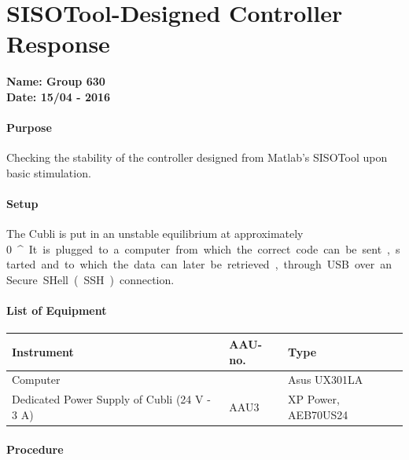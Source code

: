 \chapter{SISOTool-Designed Controller Response} \label{app:sisoToolDControllerTest}
\textbf{Name: Group 630}\\
\textbf{Date: 15/04 - 2016}

\subsubsection{Purpose}
Checking the stability of the controller designed from Matlab's SISOTool upon basic stimulation.

\subsubsection{Setup}
The Cubli is put in an unstable equilibrium at approximately \SI{0}{^{\circ}}. 
It is plugged to a computer from which the correct code can be sent, started and to which the data can later be retrieved, through USB over an Secure SHell (SSH) connection.

\subsubsection{List of Equipment}
\begin{table}[H]
\begin{tabular}{|p{8cm}|p{2cm}|p{4cm}|}
\hline%
  \textbf{Instrument}    &  \textbf{AAU-no.}          &  \textbf{Type} \\
\hline%
  Computer               &            &  Asus UX301LA  \\
\hline%
Dedicated Power Supply of Cubli \small{(24 V - 3 A)} &  AAU3                   &  XP Power, AEB70US24                 \\
\hline%
\end{tabular}
\end{table}

\subsubsection{Procedure}

